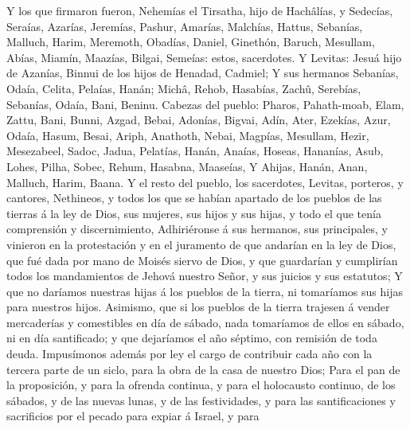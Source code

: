  Y los que firmaron fueron, Nehemías el Tirsatha, hijo de
Hachâlías, y Sedecías,  Seraías, Azarías, Jeremías,
 Pashur, Amarías, Malchías,  Hattus,
Sebanías, Malluch,  Harim, Meremoth, Obadías,
 Daniel, Ginethón, Baruch,  Mesullam, Abías,
Miamín,  Maazías, Bilgai, Semeías: estos, sacerdotes.
 Y Levitas: Jesuá hijo de Azanías, Binnui de los hijos de
Henadad, Cadmiel;  Y sus hermanos Sebanías, Odaía,
Celita, Pelaías, Hanán;  Michâ, Rehob, Hasabías,
 Zachû, Serebías, Sebanías,  Odaía, Bani,
Beninu.  Cabezas del pueblo: Pharos, Pahath-moab, Elam,
Zattu, Bani,  Bunni, Azgad, Bebai, 
Adonías, Bigvai, Adín,  Ater, Ezekías, Azur,
 Odaía, Hasum, Besai,  Ariph, Anathoth,
Nebai,  Magpías, Mesullam, Hezir, 
Mesezabeel, Sadoc, Jadua,  Pelatías, Hanán, Anaías,
 Hoseas, Hananías, Asub,  Lohes, Pilha,
Sobec,  Rehum, Hasabna, Maaseías,  Y
Ahijas, Hanán, Anan,  Malluch, Harim, Baana.
 Y el resto del pueblo, los sacerdotes, Levitas,
porteros, y cantores, Nethineos, y todos los que se habían apartado de
los pueblos de las tierras á la ley de Dios, sus mujeres, sus hijos y
sus hijas, y todo el que tenía comprensión y discernimiento,
 Adhiriéronse á sus hermanos, sus principales, y vinieron
en la protestación y en el juramento de que andarían en la ley de Dios,
que fué dada por mano de Moisés siervo de Dios, y que guardarían y
cumplirían todos los mandamientos de Jehová nuestro Señor, y sus juicios
y sus estatutos;  Y que no daríamos nuestras hijas á los
pueblos de la tierra, ni tomaríamos sus hijas para nuestros hijos.
 Asimismo, que si los pueblos de la tierra trajesen á
vender mercaderías y comestibles en día de sábado, nada tomaríamos de
ellos en sábado, ni en día santificado; y que dejaríamos el año séptimo,
con remisión de toda deuda.  Impusímonos además por ley
el cargo de contribuir cada año con la tercera parte de un siclo, para
la obra de la casa de nuestro Dios;  Para el pan de la
proposición, y para la ofrenda continua, y para el holocausto continuo,
de los sábados, y de las nuevas lunas, y de las festividades, y para las
santificaciones y sacrificios por el pecado para expiar á Israel, y para
